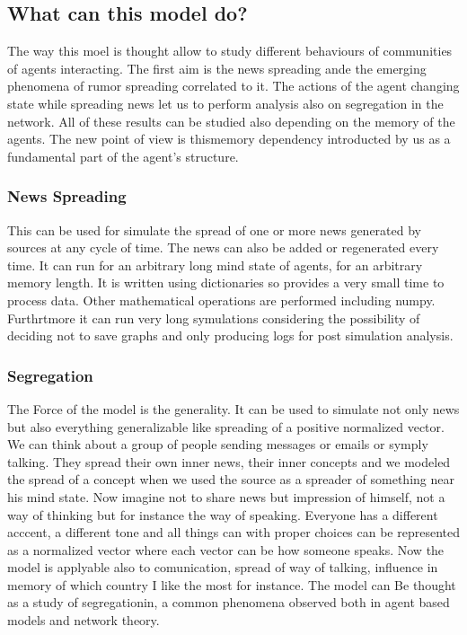 \subsection{What can this model do?}
The way this moel is thought allow to study different behaviours of
communities of agents interacting.
The first aim is the news spreading ande the emerging phenomena of
rumor spreading correlated to it.
The actions of the agent changing state while spreading news let
us to perform analysis also on segregation in the network.
All of these results can be studied also depending on the memory
of the agents. The new point of view is thismemory dependency
introducted by us as a fundamental part of the agent's structure.

\subsubsection{News Spreading}
This can be used for simulate the spread of one or more news generated
by sources at any cycle of time. The news can also be added or regenerated
every time. It can run for an arbitrary long mind state of agents,
for an arbitrary memory length.
It is written using dictionaries so provides a very small time to process data.
Other mathematical operations are performed including numpy.
Furthrtmore it can run very long symulations considering the possibility
of deciding not to save graphs and only producing logs for post simulation
analysis.

\subsubsection{Segregation}
The Force of the model is the generality. It can be used to simulate not
only news but also everything generalizable like spreading of a positive
normalized vector.
We can think about a group of people sending messages or emails or symply
talking. They spread their own inner news, their inner concepts and we modeled
the spread of a concept when we used the source as a spreader of something near
his mind state.
Now imagine not to share news but impression of himself, not a way of thinking
but for instance the way of speaking. Everyone has a different acccent, a
different tone and all things can with proper choices can be represented
as a normalized vector where each vector can be how someone speaks.
Now the model is applyable also to comunication, spread of way of talking,
influence in memory of which country I like the most for instance.
The model can Be thought as a study of segregationin, a common phenomena
observed both in agent based models and network theory.
